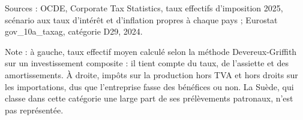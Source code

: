Sources : OCDE, Corporate Tax Statistics, taux effectifs d'imposition 2025, scénario aux taux d'intérêt et d'inflation propres à chaque pays ; Eurostat gov\_10a\_taxag, catégorie D29, 2024.\par Note : à gauche, taux effectif moyen calculé selon la méthode Devereux-Griffith sur un investissement composite : il tient compte du taux, de l'assiette et des amortissements. À droite, impôts sur la production hors TVA et hors droits sur les importations, dus que l'entreprise fasse des bénéfices ou non. La Suède, qui classe dans cette catégorie une large part de ses prélèvements patronaux, n'est pas représentée.
